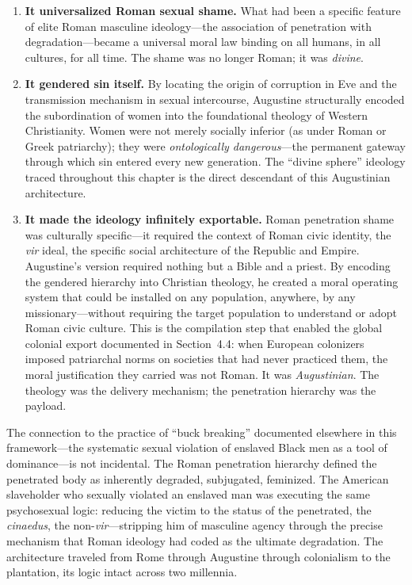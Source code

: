 \documentclass[12pt,openany]{book}
\begin{document}
\begin{enumerate}
    \item \textbf{It universalized Roman sexual shame.} What had been a specific feature of elite Roman masculine ideology---the association of penetration with degradation---became a universal moral law binding on all humans, in all cultures, for all time. The shame was no longer Roman; it was \textit{divine}.

    \item \textbf{It gendered sin itself.} By locating the origin of corruption in Eve and the transmission mechanism in sexual intercourse, Augustine structurally encoded the subordination of women into the foundational theology of Western Christianity. Women were not merely socially inferior (as under Roman or Greek patriarchy); they were \textit{ontologically dangerous}---the permanent gateway through which sin entered every new generation. The ``divine sphere'' ideology traced throughout this chapter is the direct descendant of this Augustinian architecture.

    \item \textbf{It made the ideology infinitely exportable.} Roman penetration shame was culturally specific---it required the context of Roman civic identity, the \textit{vir} ideal, the specific social architecture of the Republic and Empire. Augustine's version required nothing but a Bible and a priest. By encoding the gendered hierarchy into Christian theology, he created a moral operating system that could be installed on any population, anywhere, by any missionary---without requiring the target population to understand or adopt Roman civic culture. This is the compilation step that enabled the global colonial export documented in Section~4.4: when European colonizers imposed patriarchal norms on societies that had never practiced them, the moral justification they carried was not Roman. It was \textit{Augustinian}. The theology was the delivery mechanism; the penetration hierarchy was the payload.
\end{enumerate}

The connection to the practice of ``buck breaking'' documented elsewhere in this framework---the systematic sexual violation of enslaved Black men as a tool of dominance---is not incidental. The Roman penetration hierarchy defined the penetrated body as inherently degraded, subjugated, feminized. The American slaveholder who sexually violated an enslaved man was executing the same psychosexual logic: reducing the victim to the status of the penetrated, the \textit{cinaedus}, the non-\textit{vir}---stripping him of masculine agency through the precise mechanism that Roman ideology had coded as the ultimate degradation. The architecture traveled from Rome through Augustine through colonialism to the plantation, its logic intact across two millennia.
\end{document}
